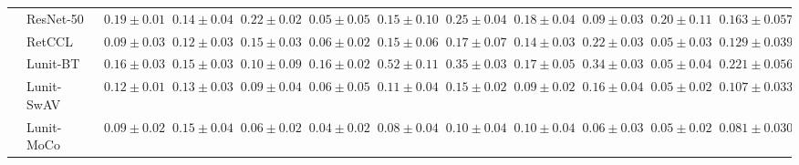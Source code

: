\begin{tabular}{ll|cccc|c|cccc|c}
 & ResNet-50~\cite{he2015deep} & $0.19 \pm 0.01$ & $0.14 \pm 0.04$ & $0.22 \pm 0.02$ & $0.05 \pm 0.05$ & $0.15 \pm 0.10$ & $0.25 \pm 0.04$ & $0.18 \pm 0.04$ & $0.09 \pm 0.03$ & $0.20 \pm 0.11$ & $0.163 \pm 0.057$ \\
 & RetCCL~\cite{wang2023retccl} & $0.09 \pm 0.03$ & $0.12 \pm 0.03$ & $0.15 \pm 0.03$ & $0.06 \pm 0.02$ & $0.15 \pm 0.06$ & $0.17 \pm 0.07$ & $0.14 \pm 0.03$ & $0.22 \pm 0.03$ & $0.05 \pm 0.03$ & $0.129 \pm 0.039$ \\
 & Lunit-BT~\cite{kang2023benchmarking} & $0.16 \pm 0.03$ & $0.15 \pm 0.03$ & $0.10 \pm 0.09$ & $0.16 \pm 0.02$ & $0.52 \pm 0.11$ & $0.35 \pm 0.03$ & $0.17 \pm 0.05$ & $0.34 \pm 0.03$ & $0.05 \pm 0.04$ & $0.221 \pm 0.056$ \\
 & Lunit-SwAV~\cite{kang2023benchmarking} & $0.12 \pm 0.01$ & $0.13 \pm 0.03$ & $0.09 \pm 0.04$ & $0.06 \pm 0.05$ & $0.11 \pm 0.04$ & $0.15 \pm 0.02$ & $0.09 \pm 0.02$ & $0.16 \pm 0.04$ & $0.05 \pm 0.02$ & $0.107 \pm 0.033$ \\
 & Lunit-MoCo~\cite{kang2023benchmarking} & $0.09 \pm 0.02$ & $0.15 \pm 0.04$ & $0.06 \pm 0.02$ & $0.04 \pm 0.02$ & $0.08 \pm 0.04$ & $0.10 \pm 0.04$ & $0.10 \pm 0.04$ & $0.06 \pm 0.03$ & $0.05 \pm 0.02$ & $0.081 \pm 0.030$ \\
\cline{1-12}
\bottomrule
\end{tabular}

